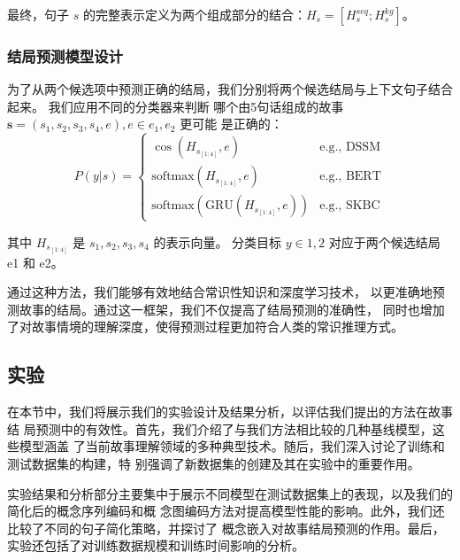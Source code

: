 最终，句子 $s$ 的完整表示定义为两个组成部分的结合：$H_s=[H_s^{seq}; H_s^{kg}]$。

\subsubsection{结局预测模型设计}
\label{sec2:classifier}
为了从两个候选项中预测正确的结局，我们分别将两个候选结局与上下文句子结合起来。
我们应用不同的分类器来判断
哪个由5句话组成的故事 $\textbf{s}=(s_1, s_2, s_3, s_4, e),e\in{e_1,e_2}$ 更可能
是正确的： 
\begin{equation}
    P\left( y|s \right) = \left\{
        \begin{matrix}
        \cos \left( H_{s_{[1:4]}}, e \right) & \text{e.g., DSSM} \\ 
        \text{softmax}\left( H_{s_{[1:4]}}, e \right) & \text{e.g., BERT} \\
        \text{softmax}\left( \text{GRU}\left( H_{s_{[1:4]}}, e \right) \right) & \text{e.g., SKBC}
        \end{matrix}
    \right.
    \end{equation}
        
    其中 $H_{s_{[1:4]}}$ 是 ${s_1, s_2, s_3, s_4}$ 的表示向量。
    分类目标 $y\in{1,2}$ 对应于两个候选结局 e1 和 e2。

    通过这种方法，我们能够有效地结合常识性知识和深度学习技术，
    以更准确地预测故事的结局。通过这一框架，我们不仅提高了结局预测的准确性，
    同时也增加了对故事情境的理解深度，使得预测过程更加符合人类的常识推理方式。


\subsection{实验}
\label{sec2:experiment}

在本节中，我们将展示我们的实验设计及结果分析，以评估我们提出的方法在故事结
局预测中的有效性。首先，我们介绍了与我们方法相比较的几种基线模型，这些模型涵盖
了当前故事理解领域的多种典型技术。随后，我们深入讨论了训练和测试数据集的构建，特
别强调了新数据集的创建及其在实验中的重要作用。

实验结果和分析部分主要集中于展示不同模型在测试数据集上的表现，以及我们的简化后的概念序列编码和概
念图编码方法对提高模型性能的影响。此外，我们还比较了不同的句子简化策略，并探讨了
概念嵌入对故事结局预测的作用。最后，实验还包括了对训练数据规模和训练时间影响的分析。

